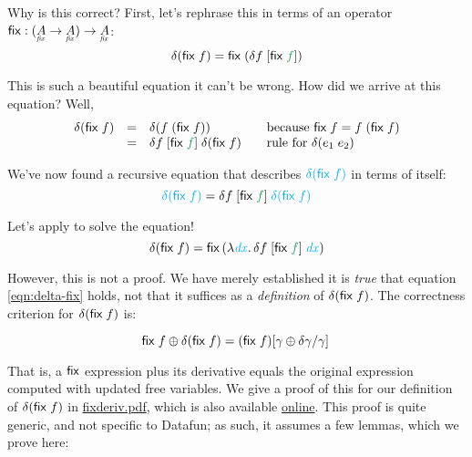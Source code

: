 \documentclass{article}
\newcommand{\preserve}[1]{{\color{ForestGreen}{#1}}}
\begin{document}
Why is this correct? First, let's rephrase this in terms of an operator
$\ms{fix} : (\fixtype{A} \to \fixtype{A}) \to \fixtype{A}$:
\begin{equation}
  \delta(\ms{fix}\; f) = \ms{fix}\; (\delta f \;\disc{\ms{fix}\; \preserve{f}})
\end{equation}

This is such a beautiful equation it can't be wrong. How did we arrive at this
equation? Well,
\[
\begin{array}{rcl>{\hspace{1em}}l}
  \delta(\ms{fix}\; f)
  &=& \delta(f \;(\ms{fix}\;f))
  & \text{because}~\ms{fix}\; f = f\;(\ms{fix}\;f)\\
  &=& \delta f \;\disc{\ms{fix}\; \preserve{f}} \; \delta(\ms{fix}\; f)
  & \text{rule for}~\delta(e_1\;e_2)
\end{array}
\]

We've now found a recursive equation that describes
${\color{Cyan}\delta(\ms{fix}\;f)}$ in terms of itself:
\begin{equation}\label{eqn:delta-fix}
  {\color{Cyan} \delta(\ms{fix}\;f)}
  = \delta f\;\disc{\ms{fix}\; \preserve{f}}\;{\color{Cyan}\delta(\ms{fix}\;f)}
\end{equation}

Let's apply  to solve the equation!
\begin{equation}
  \delta(\ms{fix}\; f)
  =
  \ms{fix}\,(\lam{\m{\color{Cyan} dx}}
  \delta f \;\disc{\ms{fix}\;\preserve{f}} \;{\m{\color{Cyan} dx}})
\end{equation}

However, this is not a proof. We have merely established it is \emph{true} that equation \ref{eqn:delta-fix} holds, not that it suffices as a \emph{definition} of $\delta(\mathsf{fix}\;f)$. The correctness criterion for $\delta(\mathsf{fix}\; f)$ is:

\begin{equation}
  \mathsf{fix}\;f \oplus \delta(\mathsf{fix}\;f)
  = (\mathsf{fix}\;f)[{\gamma \oplus \delta\gamma/\gamma}]\,
\end{equation}

That is, a $\mathsf{fix}$ expression plus its derivative equals the original
expression computed with updated free variables. We give a proof of this for our
definition of $\delta(\mathsf{fix}\;f)$ in \url{fixderiv.pdf}, which is also
available \href{http://www.rntz.net/files/fixderiv.pdf}{online}. This proof is
quite generic, and not specific to Datafun; as such, it assumes a few lemmas,
which we prove here:
\end{document}
